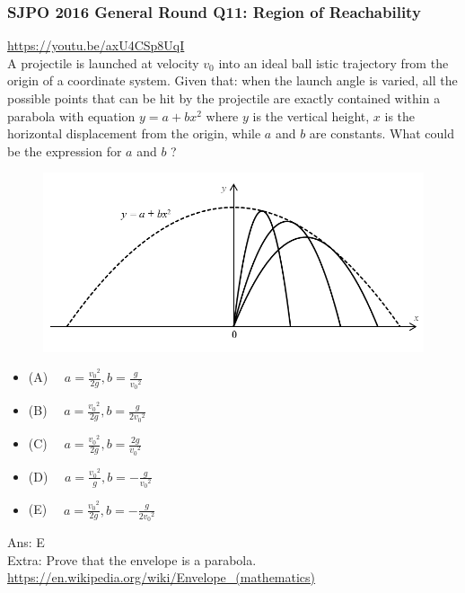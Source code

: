 \documentclass{article}
\begin{document}
\begin{samepage}
\subsubsection{SJPO 2016 General Round Q11: Region of Reachability}
\url{https://youtu.be/axU4CSp8UqI}\\[10pt]
A projectile is launched at velocity $v_0$ into an ideal ball istic trajectory from the origin of a coordinate system. Given that: when the launch angle is varied, all the possible points that can be hit by the projectile are exactly contained within a parabola with equation $y=a+b x^2$ where $y$ is the vertical height, $x$ is the horizontal displacement from the origin, while $a$ and $b$ are constants. What could be the expression for $a$ and $b$ ?\\
 \begin{figure} 
\includegraphics[width=\linewidth]{images/sjpo2016q11.png}
\end{figure}
\begin{itemize}
\item[](A) $\quad a=\frac{v_0{ }^2}{2 g}, b=\frac{g}{v_0{ }^2}$
\item[](B) $\quad a=\frac{v_0{ }^2}{2 g}, b=\frac{g}{2 v_0{ }^2}$
\item[](C) $\quad a=\frac{v_0{ }^2}{2 g}, b=\frac{2 g}{v_0{ }^2}$
\item[](D) $\quad a=\frac{v_0{ }^2}{g}, b=-\frac{g}{v_0{ }^2}$
\item[](E) $\quad a=\frac{v_0{ }^2}{2 g}, b=-\frac{g}{2 v_0{ }^2}$
\end{itemize}
Ans: \ifpaper E \fi \\[10pt]
Extra: Prove that the envelope is a parabola. \url{https://en.wikipedia.org/wiki/Envelope_(mathematics)}
\end{samepage}
\end{document}

